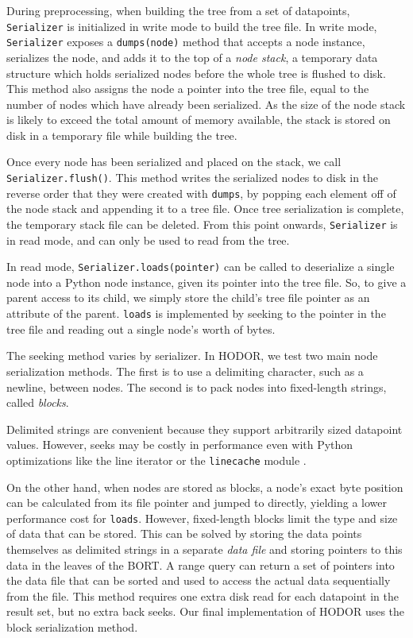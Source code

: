 \documentclass[11pt, oneside]{article}
\newcommand{\ms}{\texttt}
\begin{document}
During preprocessing, when building the tree from a set of datapoints,
\ms{Serializer} is initialized in write mode to build the tree file. In write
mode, \ms{Serializer} exposes a \ms{dumps(node)} method that accepts a node
instance, serializes the node, and adds it to the top of a \textit{node stack},
a temporary data structure which holds serialized nodes before the whole tree is
flushed to disk. This method also assigns the node a pointer into the tree file,
equal to the number of nodes which have already been serialized. As the size of
the node stack is likely to exceed the total amount of memory available, the
stack is stored on disk in a temporary file while building the tree. 

Once every node has been serialized and placed on the stack, we call
\ms{Serializer.flush()}. This method writes the serialized nodes to disk in the
reverse order that they were created with \ms{dumps}, by popping each element
off of the node stack and appending it to a tree file. Once tree serialization
is complete, the temporary stack file can be deleted. From this point onwards,
\ms{Serializer} is in read mode, and can only be used to read from the tree.

In read mode, \ms{Serializer.loads(pointer)} can be called to deserialize a
single node into a Python node instance, given its pointer into the tree file.
So, to give a parent access to its child, we simply store the child's tree file
pointer as an attribute of the parent. \ms{loads} is implemented by seeking to
the pointer in the tree file and reading out a single node's worth of bytes.

The seeking method varies by serializer. In HODOR, we test two main node
serialization methods. The first is to use a delimiting character, such as a
newline, between nodes. The second is to pack nodes into fixed-length strings,
called \textit{blocks}. 

Delimited strings are convenient because they support arbitrarily sized
datapoint values. However, seeks may be costly in performance even with Python
optimizations like the line iterator or the \ms{linecache} module
\cite{linecache}.

On the other hand, when nodes are stored as blocks, a node's exact byte
position can be calculated from its file pointer and jumped to directly,
yielding a lower performance cost for \ms{loads}. However, fixed-length
blocks limit the type and size of data that can be stored. This can be solved by
storing the data points themselves as delimited strings in a separate
\textit{data file} and storing pointers to this data in the leaves of the
BORT. A range query can return a set of pointers into the data file that can
be sorted and used to access the actual data sequentially from the file. This
method requires one extra disk read for each datapoint in the result set, but no
extra back seeks. Our final implementation of HODOR uses the block serialization
method.  
\end{document}
